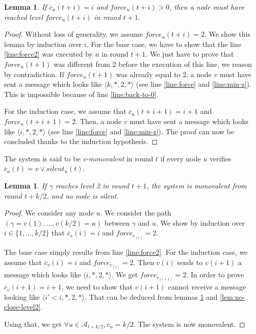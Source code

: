\documentclass[11pt,letterpaper]{article}
\newtheorem{lem}[thm]{Lemma}
\newcommand{\cent}{\gamma}
\begin{document}
\begin{lem} \label{lem:safety-force}
	If $\overline{c}_u(t+i) = i$ and $force_u(t+i) > 0$, then a node must have reached level $force_u(t+i)$ in round $t+1$.
\end{lem}
\begin{proof}
	Without loss of generality, we assume $force_u(t+i) = 2$.
	We show this lemma by induction over $i$.
	For the base case, we have to show that the line \ref{line:force2} was executed by $u$ in round $t+1$.
	We just have to prove that $force_u(t+1)$ was different from 2 before the execution of this line, we reason by contradiction.
	If $force_u(t+1)$ was already equal to 2, a node $v$ must have sent a message which looks like $\langle k, *, 2, * \rangle$ (see line \ref{line:force} and \ref{line:min-z}).
	This is impossible because of line \ref{line:back-to-0}.

	For the induction case, we assume that $\overline{c}_u(t+i+1) = i+1$ and $force_u(t+i+1) = 2$.
	Then, a node $v$ must have sent a message which looks like $\langle i, *, 2, * \rangle$ (see line \ref{line:force} and \ref{line:min-z}).
	The proof can now be concluded thanks to the induction hypothesis.
\end{proof}

The system is said to be \textit{v-monovalent} in round $t$ if every node $u$ verifies $\overline{c}_u(t) = v \vee silent_u(t)$.

\begin{lem} \label{lem:monovalent}
	If $\cent$ reaches level 2 in round $t+1$, the system is monovalent from round $t+k/2$, and no node is silent.
\end{lem}
\begin{proof}
	We consider any node $u$.	
	We consider the path $(\cent = v(1), \dots, v(k/2) = u)$ between $\cent$ and $u$.
	We show by induction over $i \in \{1, \dots, k/2\}$ that $\overline{c}_v(i) = i$ and $force_c_(i) = 2$.

	The base case simply results from line \ref{line:force2}.
	For the induction case, we assume that $\overline{c}_v(i) = i$ and $force_c_(i) = 2$.
	Then $v(i)$ sends to $v(i+1)$ a message which looks like $\langle i, *, 2, * \rangle$.
	We get $force_c_(i+1) = 2$.
	In order to prove $\overline{c}_v(i+1) = i+1$, we need to show that $v(i+1)$ cannot receive a message looking like $\langle i' < i, *, 2, * \rangle$.
	That can be deduced from lemmas \ref{lem:safety-force} and \ref{lem:no-close-level2}.

	Using that, we get $\forall u \in \mathcal{A}_{t+k/2}, \overline{c}_u = k/2$. The system is now monovalent.
\end{proof}
\end{document}
